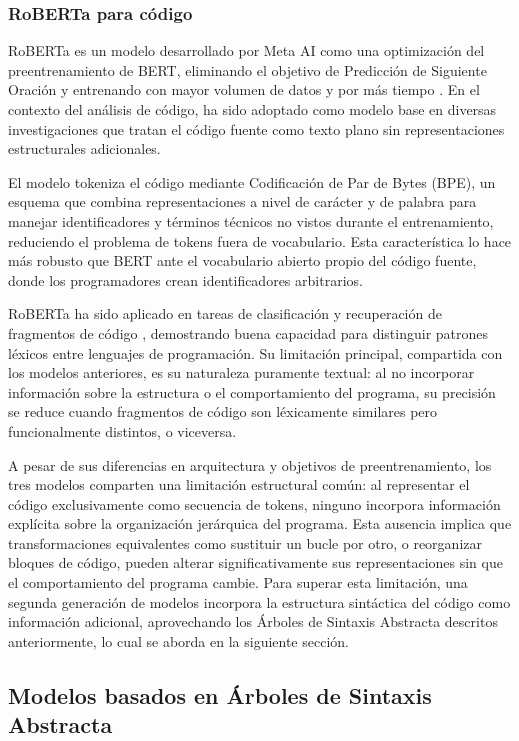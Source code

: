 \subsubsection{RoBERTa para código}

RoBERTa es un modelo desarrollado por Meta AI como una optimización del 
preentrenamiento de BERT, eliminando el objetivo de Predicción de Siguiente 
Oración y entrenando con mayor volumen de datos y por más tiempo \cite{Liu2019RoBERTa}. 
En el contexto del análisis de código, ha sido adoptado como modelo base en 
diversas investigaciones que tratan el código fuente como texto plano sin 
representaciones estructurales adicionales.

El modelo tokeniza el código mediante Codificación de Par de Bytes (BPE), un 
esquema que combina representaciones a nivel de carácter y de palabra para 
manejar identificadores y términos técnicos no vistos durante el entrenamiento, 
reduciendo el problema de tokens fuera de vocabulario. Esta característica lo 
hace más robusto que BERT ante el vocabulario abierto propio del código fuente, 
donde los programadores crean identificadores arbitrarios.

RoBERTa ha sido aplicado en tareas de clasificación y recuperación de fragmentos 
de código \cite{Yang2021DeepSCC}, demostrando buena capacidad para distinguir patrones léxicos entre 
lenguajes de programación. Su limitación principal, compartida con los modelos 
anteriores, es su naturaleza puramente textual: al no incorporar información 
sobre la estructura o el comportamiento del programa, su precisión se reduce 
cuando fragmentos de código son léxicamente similares pero funcionalmente 
distintos, o viceversa.

A pesar de sus diferencias en arquitectura y objetivos de preentrenamiento, los 
tres modelos comparten una limitación estructural común: al representar el código 
exclusivamente como secuencia de tokens, ninguno incorpora información explícita 
sobre la organización jerárquica del programa. Esta ausencia implica que 
transformaciones equivalentes como sustituir un bucle por otro, o reorganizar 
bloques de código, pueden alterar significativamente sus representaciones sin 
que el comportamiento del programa cambie. Para superar esta limitación, una 
segunda generación de modelos incorpora la estructura sintáctica del código como 
información adicional, aprovechando los Árboles de Sintaxis Abstracta descritos 
anteriormente, lo cual se aborda en la siguiente sección.

\subsection{Modelos basados en Árboles de Sintaxis Abstracta}

